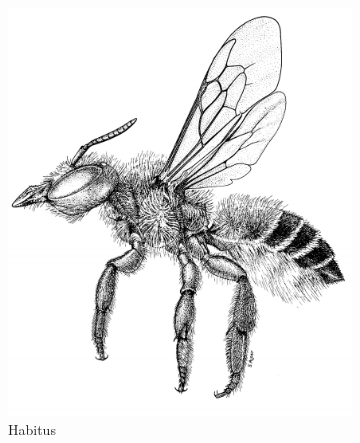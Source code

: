 \documentclass[letterpaper, 11pt]{article}
\begin{document}
\begin{figure}[ht!]
    \centering
     \begin{subfigure}[ht!]{0.4\textwidth}
        \includegraphics[width=\textwidth]{MegachilidHabitus}
        \caption{Habitus \citep[][Fig. 116]{goulet1993hymenoptera}}
        \label{fig:megachilid1}
    \end{subfigure}
   \qquad
    \begin{subfigure}[ht!]{0.3\textwidth}

\end{subfigure}
\end{figure}
\end{document}
